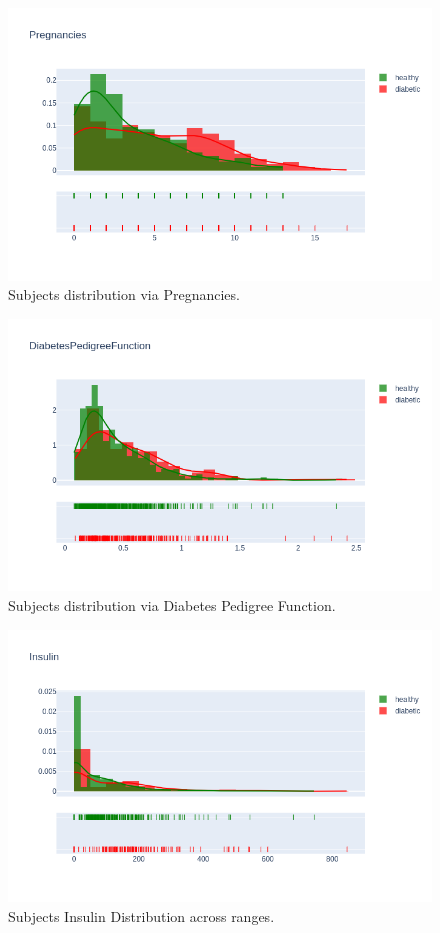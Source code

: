 \documentclass[12pt]{article}
\begin{document}
\begin{figure}[ht]
\centering
\includegraphics[width=1\textwidth]{12.png}
\caption{\label{fig:3} Subjects distribution via Pregnancies.}
\end{figure}

\begin{figure}[ht]
\centering
\includegraphics[width=1\textwidth]{13.png}
\caption{\label{fig:4} Subjects distribution via Diabetes Pedigree Function.}
\end{figure}

\begin{figure}[ht]
\centering
\includegraphics[width=1\textwidth]{14.png}
\caption{\label{fig:5} Subjects Insulin Distribution across ranges.}
\end{figure}
\end{document}
